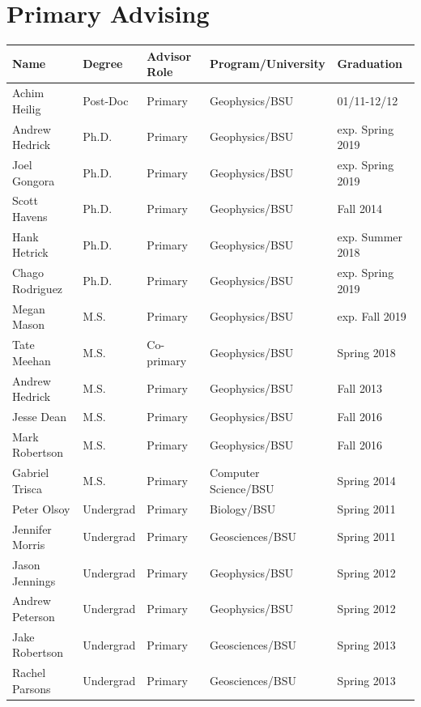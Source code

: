 \documentclass[11pt]{article}
\renewcommand\arraystretch{1}
\begin{document}
\pagebreak

\section*{Primary Advising}
\begin{table}[!htbp]
\renewcommand\arraystretch{0.7}
  \centering
  \begin{tabular}{|l|l|l|l|l|}
\hline
\textbf{Name} & \textbf{Degree} & \textbf{Advisor Role} & \textbf{Program/University} & \textbf{Graduation} \\ \hline \hline
Achim Heilig & Post-Doc & Primary & Geophysics/BSU & 01/11-12/12 \\ \hline
Andrew Hedrick & Ph.D. & Primary & Geophysics/BSU & exp. Spring 2019 \\ \hline
Joel Gongora & Ph.D. & Primary & Geophysics/BSU & exp. Spring 2019 \\ \hline
Scott Havens & Ph.D. & Primary & Geophysics/BSU & Fall 2014 \\ \hline
Hank Hetrick & Ph.D. & Primary & Geophysics/BSU & exp. Summer 2018 \\ \hline
Chago Rodriguez & Ph.D. & Primary & Geophysics/BSU & exp. Spring 2019 \\ \hline
Megan Mason & M.S. & Primary & Geophysics/BSU & exp. Fall 2019 \\ \hline
Tate Meehan & M.S. & Co-primary & Geophysics/BSU & Spring 2018 \\ \hline
Andrew Hedrick & M.S. & Primary & Geophysics/BSU & Fall 2013 \\ \hline
Jesse Dean & M.S. & Primary & Geophysics/BSU & Fall 2016 \\ \hline
Mark Robertson & M.S. & Primary & Geophysics/BSU & Fall 2016 \\ \hline
Gabriel Trisca & M.S. & Primary & Computer Science/BSU & Spring 2014 \\ \hline
Peter Olsoy & Undergrad & Primary & Biology/BSU & Spring 2011 \\ \hline
Jennifer Morris & Undergrad & Primary & Geosciences/BSU & Spring 2011 \\ \hline
Jason Jennings & Undergrad & Primary & Geophysics/BSU & Spring 2012 \\ \hline
Andrew Peterson & Undergrad & Primary & Geophysics/BSU & Spring 2012 \\ \hline
Jake Robertson & Undergrad & Primary & Geosciences/BSU & Spring 2013 \\ \hline
Rachel Parsons & Undergrad & Primary & Geosciences/BSU & Spring 2013 \\ \hline

\end{tabular}
\end{table}
\end{document}
